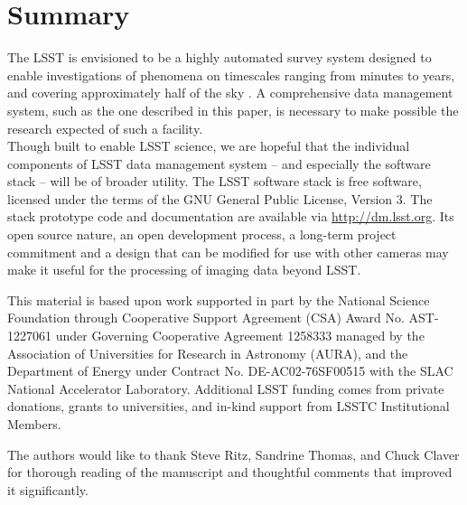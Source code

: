 \documentclass[11pt,twoside]{article}
\begin{document}
\section{               Summary              }
\label{sec:summary}

The LSST is envisioned to be a highly automated survey system
designed to enable investigations of phenomena on timescales ranging
from minutes to years, and covering approximately half of the sky
\citep{2009arXiv0912.0201L}. A comprehensive data management system,
such as the one described in this paper, is necessary to make possible
the research expected of such a facility.
\\

Though built to enable LSST science, we are hopeful that the individual
components of LSST data management system -- and especially the software
stack -- will be of broader utility.  The LSST software stack is free
software, licensed under the terms of the GNU General Public License,
Version 3.  The stack prototype code and documentation are available via
\url{http://dm.lsst.org}. Its open source nature, an open development process,
a long-term project commitment and a design that can be modified for use
with other cameras may make it useful for the processing of imaging data
beyond LSST.
\\

\acknowledgements

This material is based upon work supported in part by the National
Science Foundation through Cooperative Support Agreement (CSA) Award
No. AST-1227061 under Governing Cooperative Agreement 1258333 managed
by the Association of Universities for Research in Astronomy (AURA),
and the Department of Energy under Contract No. DE-AC02-76SF00515 with
the SLAC National Accelerator Laboratory.  Additional LSST funding
comes from private donations, grants to universities, and in-kind
support from LSSTC Institutional Members.

The authors would like to thank Steve Ritz, Sandrine Thomas, and Chuck
Claver for thorough reading of the manuscript and thoughtful comments
that improved it significantly.

\end{document}
